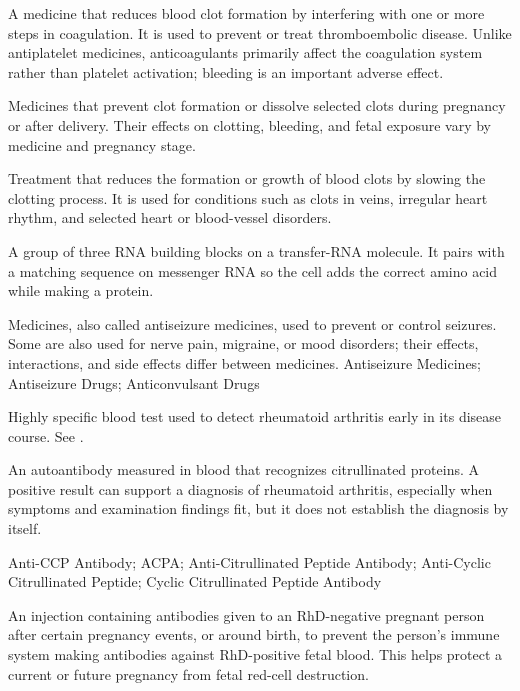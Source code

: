  A medicine that reduces blood clot formation by interfering with one or more steps in coagulation. It is used to prevent or
treat thromboembolic disease. Unlike antiplatelet medicines, anticoagulants primarily affect the coagulation system rather than
platelet activation; bleeding is an important adverse effect.

 Medicines that prevent
clot formation or dissolve selected clots during pregnancy or after delivery.
Their effects on clotting, bleeding, and fetal exposure vary by medicine and
pregnancy stage.

 Treatment that reduces the formation or growth of blood clots by slowing the clotting process. It is used for conditions such as clots in veins, irregular heart rhythm, and selected heart or blood-vessel disorders.

 A group of three RNA building blocks on a transfer-RNA molecule. It pairs with a matching sequence on messenger RNA so the cell adds the correct amino acid while making a protein.

 Medicines, also called antiseizure medicines, used to prevent or control seizures. Some are also used for nerve pain, migraine, or mood disorders; their effects, interactions, and side effects differ between medicines.
\synonyms
Antiseizure Medicines; Antiseizure Drugs; Anticonvulsant Drugs

 Highly specific blood test used to detect rheumatoid arthritis early in its disease course. See .

 An autoantibody measured in blood that recognizes citrullinated proteins. A positive result can support a diagnosis of rheumatoid arthritis, especially when symptoms and examination findings fit, but it does not establish the diagnosis by itself.

\synonyms
Anti-CCP Antibody; ACPA; Anti-Citrullinated Peptide Antibody; Anti-Cyclic Citrullinated Peptide; Cyclic Citrullinated Peptide Antibody

 An injection containing antibodies given to an RhD-negative pregnant person after certain pregnancy events, or around birth, to prevent the person’s immune system making antibodies against RhD-positive fetal blood. This helps protect a current or future pregnancy from fetal red-cell destruction.

